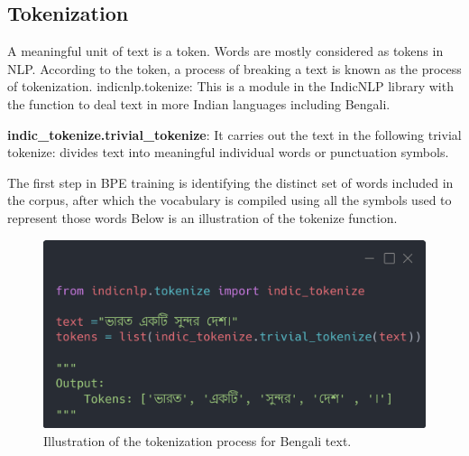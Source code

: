 \subsection{Tokenization}

\cite{BanglaGPT:2}A meaningful unit of text is a token. Words are mostly considered as tokens in NLP. According to the token, a process of breaking a text is known as the process of tokenization.
indicnlp.tokenize: This is a module in the IndicNLP library with the function to deal text in more Indian languages including Bengali.

\textbf{indic\_tokenize.trivial\_tokenize}: It carries out the text in the following trivial tokenize: divides text into meaningful individual words or punctuation symbols.

The first step in BPE training is identifying the distinct set of words included in the corpus, after which the vocabulary is compiled using all the symbols used to represent those words Below is an illustration of the tokenize function.

\begin{figure}[H]
    \centering
    \includegraphics[width=0.8\linewidth]{Attachments/Figures/tokenizer_figure1.png}
    \caption{Illustration of the tokenization process for Bengali text.}
\end{figure}